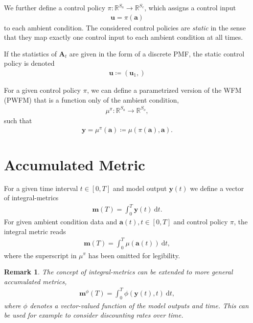 \documentclass{article}
\newtheorem{remark}{Remark}
\begin{document}
    We further define a control policy $\pi: \mathbb{R}^{S_a} \rightarrow \mathbb{R}^{S_c}$,
    which assigns a control input
    \begin{align}
        \boldsymbol{u} = \pi(\boldsymbol{a})
    \end{align}
    to each ambient condition. The considered control policies are \textit{static} in the sense that they map exactly one control input to each ambient condition at all times.

    If the statistics of $\boldsymbol{A}_t$ are given in the form of a discrete PMF, the static control policy is denoted
    \begin{align}
        \mathbf{u} \coloneqq (\boldsymbol{u}_1,)
    \end{align}

    For a given control policy $\pi$, we can define a parametrized version of the WFM (PWFM) that is a function only of the ambient condition, 
    \begin{align}
        \mu^\pi: \mathbb{R}^{S_a} \rightarrow \mathbb{R}^{S_o},
    \end{align}
    such that
    \begin{align}
        \boldsymbol{y} = \mu^\pi(\boldsymbol{a}) \coloneqq \mu(\pi(\boldsymbol{a}), \boldsymbol{a}).
    \end{align}
    
    \section{Accumulated Metric}
    For a given time interval $t \in [0, T]$ and model output $\boldsymbol{y}(t)$ we define a vector of integral-metrics 
    \begin{align}
        \boldsymbol{m}(T)= \int_0^T \boldsymbol{y}(t)\ \text{d}t.
    \end{align}
    For given ambient condition data and $\boldsymbol{a}(t), t \in [0, T]$ and control policy $\pi$, the integral metric reads
    \begin{align}
        \boldsymbol{m}(T)= \int_0^T \mu(\boldsymbol{a}(t))\ \text{d}t,
    \end{align}
    where the superscript in $\mu^\pi$ has been omitted for legibility.
    \begin{remark}
        The concept of integral-metrics can be extended to more general \textit{accumulated metrics},
        \begin{align}
        {\boldsymbol{m}}^\phi(T)= \int_0^T \phi(\boldsymbol{y}(t), t)\ \text{d}t,
        \end{align}
        where $\phi$ denotes a vector-valued function of the model outputs and time. This can be used for example to consider discounting rates over time.
    \end{remark}
\end{document}
